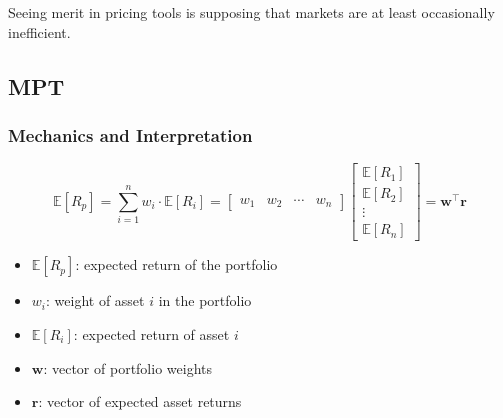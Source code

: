 Seeing merit in pricing tools is supposing that markets are at least occasionally inefficient. 

\subsection{MPT}

\subsubsection{Mechanics and Interpretation}

\[
\mathbb{E}[R_p] = \sum_{i=1}^{n} w_i \cdot \mathbb{E}[R_i]
= 
\begin{bmatrix}
w_1 & w_2 & \cdots & w_n
\end{bmatrix}
\begin{bmatrix}
\mathbb{E}[R_1] \\
\mathbb{E}[R_2] \\
\vdots \\
\mathbb{E}[R_n]
\end{bmatrix} = \mathbf{w}^\top \mathbf{r}
\]

\begin{itemize}
  \item[] $\mathbb{E}[R_p]$: expected return of the portfolio  
  \item[] $w_i$: weight of asset $i$ in the portfolio  
  \item[] $\mathbb{E}[R_i]$: expected return of asset $i$  
  \item[] $\mathbf{w}$: vector of portfolio weights  
  \item[] $\mathbf{r}$: vector of expected asset returns  
\end{itemize}

